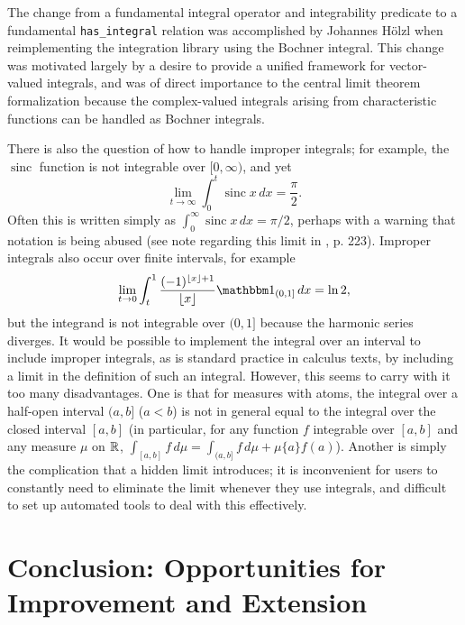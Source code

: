 \documentclass{amsart}
\theoremstyle{definition}
\theoremstyle{remark}
\newcommand\sinc{\mathop{\text{sinc}}\nolimits}
\newcommand\floor[1]{\lfloor {#1} \rfloor}
\begin{document}
The change from a fundamental integral operator and integrability predicate to a fundamental \texttt{has\_integral} relation was accomplished by Johannes H\"olzl when reimplementing the integration library using the Bochner integral. This change was motivated largely by a desire to provide a unified framework for vector-valued integrals, and was of direct importance to the central limit theorem formalization because the complex-valued integrals arising from characteristic functions can be handled as Bochner integrals.

There is also the question of how to handle improper integrals; for example, the $\sinc$ function is not integrable over $[0,\infty)$, and yet 
\[ \lim_{t \rightarrow \infty} \int_0^t \sinc x \, dx = \frac{\pi}{2}. \]
Often this is written simply as $\int_0^\infty \sinc x \, dx = \pi/2$, perhaps with a warning that notation is being abused (see note regarding this limit in \cite{Billingsley}, p. 223). Improper integrals also occur over finite intervals, for example
\[ \lim_{t \rightarrow 0} \int_t^1 \frac{(-1)^{\floor x + 1}}{\floor x} \mathbbm 1_{(0,1]} \, dx = \ln 2, \]
but the integrand is not integrable over $(0,1]$ because the harmonic series diverges. It would be possible to implement the integral over an interval to include improper integrals, as is standard practice in calculus texts, by including a limit in the definition of such an integral. However, this seems to carry with it too many disadvantages. One is that for measures with atoms, the integral over a half-open interval $(a,b]$ ($a < b$) is not in general equal to the integral over the closed interval $[a,b]$ (in particular, for any function $f$ integrable over $[a,b]$ and any measure $\mu$ on $\mathbb{R}$, $\int_{[a,b]} f \, d\mu = \int_{(a,b]} f \, d\mu + \mu \{a\} f(a)$). Another is simply the complication that a hidden limit introduces; it is inconvenient for users to constantly need to eliminate the limit whenever they use integrals, and difficult to set up automated tools to deal with this effectively.

\section{Conclusion: Opportunities for Improvement and Extension}



\end{document}
